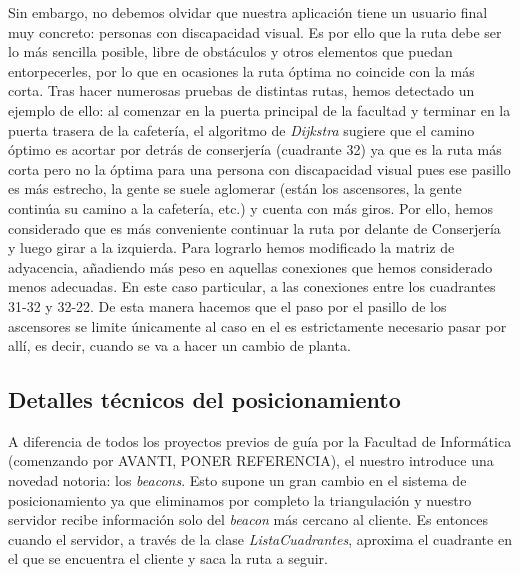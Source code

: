Sin embargo, no debemos olvidar que nuestra aplicación tiene un usuario final muy concreto: personas con discapacidad visual. Es por ello que la ruta debe ser lo más sencilla posible, libre de obstáculos y otros elementos que puedan entorpecerles, por lo que en ocasiones la ruta óptima no coincide con la más corta. Tras hacer numerosas pruebas de distintas rutas, hemos detectado un ejemplo de ello: al comenzar en la puerta principal de la facultad y terminar en la puerta trasera de la cafetería, el algoritmo de \textit{Dijkstra} sugiere que el camino óptimo es acortar por detrás de conserjería (cuadrante 32) ya que es la ruta más corta pero no la óptima para una persona con discapacidad visual pues ese pasillo es más estrecho, la gente se suele aglomerar (están los ascensores, la gente continúa su camino a la cafetería, etc.) y cuenta con más giros. Por ello, hemos considerado que es más conveniente continuar la ruta por delante de Conserjería y luego girar a la izquierda. Para lograrlo hemos modificado la matriz de adyacencia, añadiendo más peso en aquellas conexiones que hemos considerado menos adecuadas. En este caso particular, a las conexiones entre los cuadrantes 31-32 y 32-22. De esta manera hacemos que el paso por el pasillo de los ascensores se limite únicamente al caso en el es estrictamente necesario pasar por allí, es decir, cuando se va a hacer un cambio de planta.


\subsection{Detalles técnicos del posicionamiento}


A diferencia de todos los proyectos previos de guía por la Facultad de Informática (comenzando por AVANTI, PONER REFERENCIA), el nuestro introduce una novedad notoria: los \textit{beacons}. Esto supone un gran cambio en el sistema de posicionamiento ya que eliminamos por completo la triangulación y nuestro servidor recibe información solo del \textit{beacon} más cercano al cliente. Es entonces cuando el servidor, a través de la clase \textit{ListaCuadrantes}, aproxima el cuadrante en el que se encuentra el cliente y saca la ruta a seguir.  %


